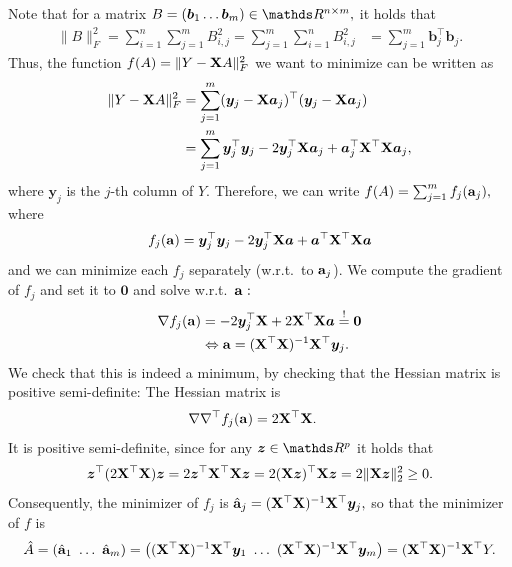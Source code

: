 \documentclass[a4paper]{article}
\begin{document}
{\begin{enumerate}
	Note that for a matrix $B = (\bm{b}_1 \ldots \bm{b}_m) \in \R^{n\times m},$ it holds that
%	
	\begin{align*} 
%		
		\| B \|^2_F  
%		 
	 	=  \sum_{i=1}^n \sum_{j=1}^m B_{i,j}^2 
%		 
		=  \sum_{j=1}^m \sum_{i=1}^n B_{i,j}^2 
%		
		&=  \sum_{j=1}^m \bm{b}_j^\top \bm{b}_j. 
%		
	\end{align*}
%
	Thus, the function $f(A)=\|Y - \mathbf{X} A \|^2_F$ we want to minimize can be written as
%	
	\begin{align*}
%		
		\|Y - \Xmat A \|^2_F 
%		
		&= \sum_{j=1}^m (\bm{y}_j -\Xmat \bm{a}_j)^\top(\bm{y}_j -\Xmat \bm{a}_j) \\
%		
		&= \sum_{j=1}^m \bm{y}_j^\top\bm{y}_j - 2 \bm{y}_j^\top \Xmat \bm{a}_j + \bm{a}_j^\top \Xmat^\top  \Xmat \bm{a}_j,
%		
	\end{align*}
%
	where $\bm{y}_j$ is the $j$-th column of $Y.$
%	
	Therefore, we can write $f(A) = \sum_{j=1}^m f_j(\mathbf{a}_j),$ where 
%	
	$$	f_j(\mathbf{a}) = 	\bm{y}_j^\top\bm{y}_j - 2 \bm{y}_j^\top \mathbf{X} \bm{a} + \bm{a}^\top \mathbf{X}^\top  \mathbf{X} \bm{a}	$$
%	
	and we can minimize each $f_j$ separately (w.r.t.\ to $\mathbf{a}_j$).
%	
	We compute the gradient of $f_j$ and set it to $\bm{0}$ and solve w.r.t.\ $\mathbf{a}:$
%	
	\begin{align*}
%		
		\nabla f_j(\ba) 
%		
		&= - 2 \bm{y}_j^\top \Xmat  + 2 \Xmat^\top  \Xmat \bm{a} \stackrel{!}{=} \bm{0} \\
%		
		&\Leftrightarrow \ba = (\Xmat^\top \Xmat)^{-1} \Xmat^\top \bm{y}_j.
%		
	\end{align*}
%
	We check that this is indeed a minimum, by checking that the Hessian matrix is positive semi-definite:
%	
	The Hessian matrix is
%
		\begin{align*}
		\nabla \nabla^\top f_j(\mathbf{a}) 
		&=   2 \mathbf{X}^\top  \mathbf{X}.
	\end{align*}
%
	It is positive semi-definite, since for any $\bm{z}\in \R^p$ it holds that
%	
	\begin{align*}
%		
		\bm{z}^\top (2 \Xmat^\top  \Xmat) \bm{z} 
%		
		= 2 \bm{z}^\top  \Xmat^\top  \Xmat  \bm{z} 
%		
		= 	2   (\Xmat  \bm{z})^\top \Xmat  \bm{z} 
%		
		= 2 \| \Xmat  \bm{z} \|_2^2 \geq 0.
%		
	\end{align*}
%
	Consequently, the minimizer of $f_j$ is $\hat{\mathbf{a}}_j= (\mathbf{X}^\top \mathbf{X})^{-1} \mathbf{X}^\top \bm{y}_j,$ so that the minimizer of $f$ is 
%	
	$$	\hat{A} = (\hat{\mathbf{a}}_1 ~ \ldots ~ \hat{\mathbf{a}}_m) = \left(	(\mathbf{X}^\top \mathbf{X})^{-1} \mathbf{X}^\top \bm{y}_1 ~ \ldots ~ (\mathbf{X}^\top \mathbf{X})^{-1} \mathbf{X}^\top \bm{y}_m		\right) = (\mathbf{X}^\top \mathbf{X})^{-1} \mathbf{X}^\top Y.	$$

\end{enumerate}}
\end{document}
